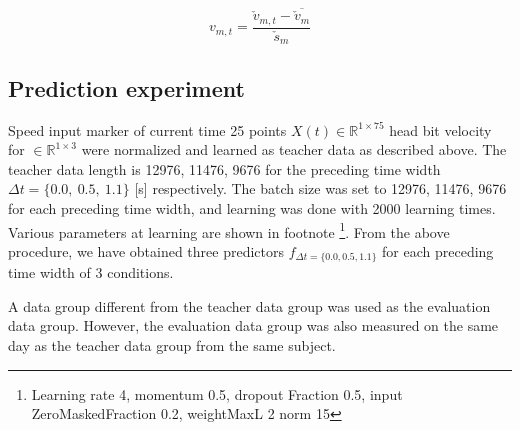 \documentclass{sigchi}
\begin{document}
\begin{equation}
  v_{m,t} = \frac{\check{v}_{m,t} - \overline{\check{v}_{m}}}{\check{s}_m} 
  \label{eq:regularization}
\end{equation}


\subsection{Prediction experiment}
Speed input marker of current time 25 points $ X (t) \in \mathbb {R} ^ {1 \times 75} $ head bit velocity for $ \in \mathbb {R}^{ 1 \times 3} $ were normalized and learned as teacher data as described above. The teacher data length is 12976, 11476, 9676 for the preceding time width $ \Delta t = \{0.0, \ 0.5, \ 1.1 \} $ [s] respectively. The batch size was set to 12976, 11476, 9676 for each preceding time width, and learning was done with 2000 learning times. Various parameters at learning are shown in footnote \footnote{Learning rate 4, momentum 0.5, dropout Fraction 0.5, input ZeroMaskedFraction 0.2, weightMaxL 2 norm 15}. From the above procedure, we have obtained three predictors $ f_{\Delta t = \{0.0, 0.5, 1.1 \}} $ for each preceding time width of 3 conditions.

A data group different from the teacher data group was used as the evaluation data group. However, the evaluation data group was also measured on the same day as the teacher data group from the same subject.


\end{document}
